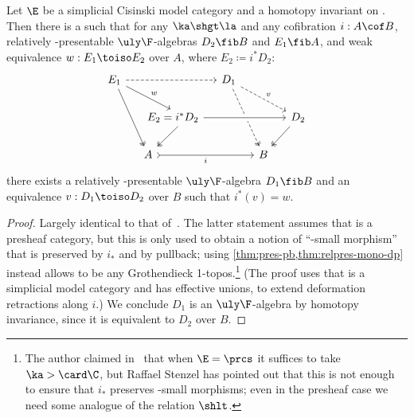 \begin{thm}\label{thm:u4p}
  Let $\E$ be a simplicial Cisinski model category and \F a homotopy invariant \nfs on \E.
  Then there is a \la such that for any $\ka\shgt\la$ and any cofibration $i: A\cof B$, relatively \ka-presentable $\uly\F$-algebras $D_2 \fib B$ and $E_1 \fib A$, and weak equivalence $w: E_1 \toiso E_2$ over $A$, where $E_2 \coloneqq i^* D_2$:
  \begin{equation}
  \begin{tikzcd}[column sep=small]
      E_1 \arrow[rdd, two heads] \arrow[rrd, "w"] \arrow[rrr, dashed] &  &  & D_1 \arrow[rdd, two heads, dashed] \arrow[rrd, "v", dashed] &  &  \\
      &  & \mathllap{E_2=\;}i^* D_2 \arrow[ld, two heads] \arrow[rrr,crossing over]
      &  &  & D_2 \arrow[ld, two heads] \\
      & A \arrow[rrr, tail,"i"'] &  &  & B & 
    \end{tikzcd}\label{eq:u4p}
  \end{equation}
  there exists a relatively \ka-presentable $\uly\F$-algebra $D_1\fib B$ and an equivalence $v: D_1 \toiso D_2$ over $B$ such that $i^*(v)=w$.
\end{thm}
\begin{proof}
  Largely identical to that of~\cite[Theorem 3.1]{shulman:elreedy}.
  The latter statement assumes that \E is a presheaf category, but this is only used to obtain a notion of ``\ka-small morphism'' that is preserved by $i_*$ and by pullback; using \cref{thm:pres-pb,thm:relpres-mono-dp} instead allows \E to be any Grothendieck 1-topos.\footnote{The author claimed in~\cite{shulman:elreedy} that when $\E=\prcs$ it suffices to take $\ka > \card\C$, but Raffael Stenzel has pointed out that this is not enough to ensure that $i_*$ preserves \ka-small morphisms; even in the presheaf case we need some analogue of the relation $\shlt$.}
  (The proof uses that \E is a simplicial model category and has effective unions, to extend deformation retractions along $i$.)
  We conclude $D_1$ is an $\uly\F$-algebra by homotopy invariance, since it is equivalent to $D_2$ over $B$.
\end{proof}

